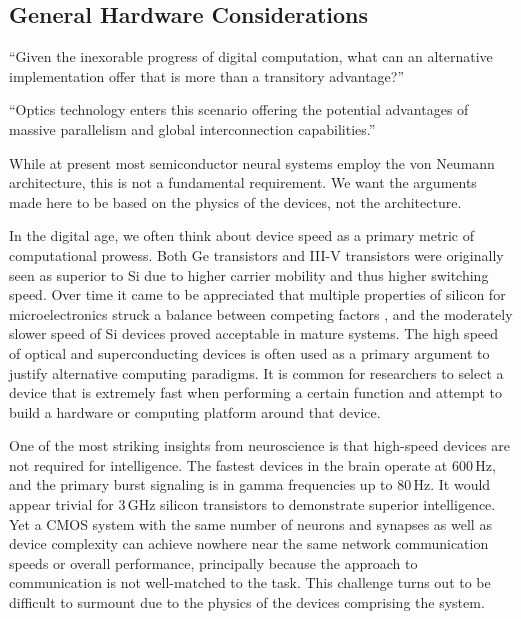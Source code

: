 \subsection{\label{sec:general_hardware_considerations}General Hardware Considerations}

``Given the inexorable progress of digital computation, what can an alternative implementation offer that is more than a transitory advantage?'' \cite{rowa2017a}

``Optics technology enters this scenario offering the potential advantages of massive parallelism and global interconnection capabilities.'' \cite{rowa2017a}

While at present most semiconductor neural systems employ the von Neumann architecture, this is not a fundamental requirement. We want the arguments made here to be based on the physics of the devices, not the architecture.

\vspace{3em}
In the digital age, we often think about device speed as a primary metric of computational prowess. Both Ge transistors and III-V transistors were originally seen as superior to Si due to higher carrier mobility and thus higher switching speed. Over time it came to be appreciated that multiple properties of silicon for microelectronics struck a balance between competing factors \cite{heza2004}, and the moderately slower speed of Si devices proved acceptable in mature systems. The high speed of optical and superconducting devices is often used as a primary argument to justify alternative computing paradigms. It is common for researchers to select a device that is extremely fast when performing a certain function and attempt to build a hardware or computing platform around that device. 

One of the most striking insights from neuroscience is that high-speed devices are not required for intelligence. The fastest devices in the brain operate at 600\,Hz, and the primary burst signaling is in gamma frequencies up to 80\,Hz. It would appear trivial for 3\,GHz silicon transistors to demonstrate superior intelligence. Yet a CMOS system with the same number of neurons and synapses as well as device complexity can achieve nowhere near the same network communication speeds or overall performance, principally because the approach to communication is not well-matched to the task. This challenge turns out to be difficult to surmount due to the physics of the devices comprising the system.

